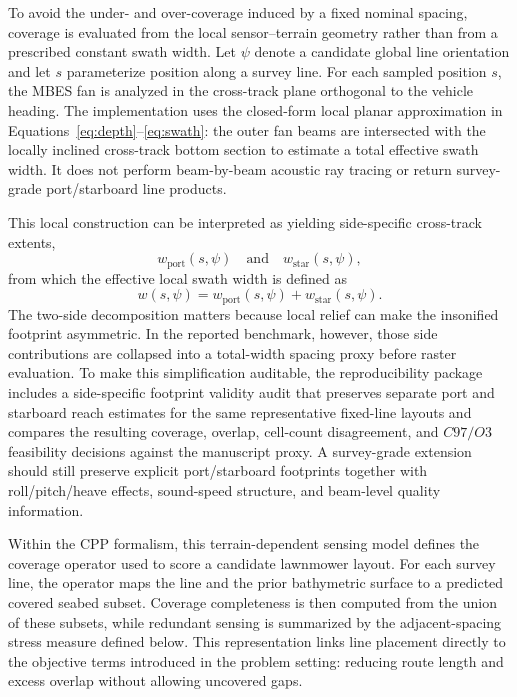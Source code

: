 \documentclass[jmse,article,submit,moreauthors]{Definitions/mdpi}
\begin{document}
To avoid the under- and over-coverage induced by a fixed nominal spacing, coverage is evaluated from the local sensor--terrain geometry rather than from a prescribed constant swath width. Let \(\psi\) denote a candidate global line orientation and let \(s\) parameterize position along a survey line. For each sampled position \(s\), the MBES fan is analyzed in the cross-track plane orthogonal to the vehicle heading. The implementation uses the closed-form local planar approximation in Equations~\eqref{eq:depth}--\eqref{eq:swath}: the outer fan beams are intersected with the locally inclined cross-track bottom section to estimate a total effective swath width. It does not perform beam-by-beam acoustic ray tracing or return survey-grade port/starboard line products.

This local construction can be interpreted as yielding side-specific cross-track extents,
\[
w_{\mathrm{port}}(s,\psi)
\quad\text{and}\quad
w_{\mathrm{star}}(s,\psi),
\]
from which the effective local swath width is defined as
\[
w(s,\psi)=w_{\mathrm{port}}(s,\psi)+w_{\mathrm{star}}(s,\psi).
\]
The two-side decomposition matters because local relief can make the insonified footprint asymmetric. In the reported benchmark, however, those side contributions are collapsed into a total-width spacing proxy before raster evaluation. To make this simplification auditable, the reproducibility package includes a side-specific footprint validity audit that preserves separate port and starboard reach estimates for the same representative fixed-line layouts and compares the resulting coverage, overlap, cell-count disagreement, and \(C97/O3\) feasibility decisions against the manuscript proxy. A survey-grade extension should still preserve explicit port/starboard footprints together with roll/pitch/heave effects, sound-speed structure, and beam-level quality information.

Within the CPP formalism, this terrain-dependent sensing model defines the coverage operator used to score a candidate lawnmower layout. For each survey line, the operator maps the line and the prior bathymetric surface to a predicted covered seabed subset. Coverage completeness is then computed from the union of these subsets, while redundant sensing is summarized by the adjacent-spacing stress measure defined below. This representation links line placement directly to the objective terms introduced in the problem setting: reducing route length and excess overlap without allowing uncovered gaps.
\end{document}
